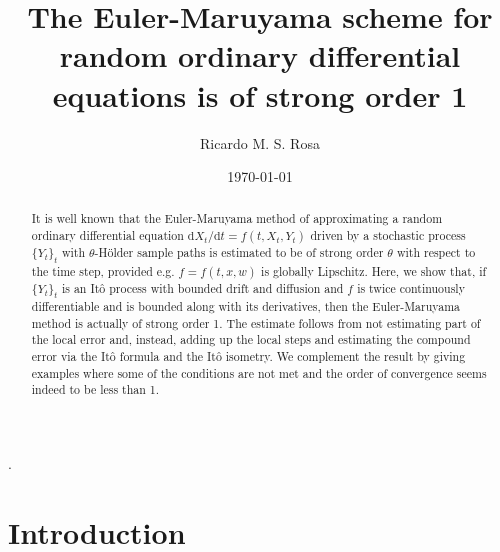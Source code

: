\documentclass[reqno,12pt]{amsart}
\theoremstyle{plain}%
\theoremstyle{definition}
\begin{document}


\title[Euler-Maruyama strong order 1 for Random ODEs]{The Euler-Maruyama scheme for random ordinary differential equations is of strong order 1}

\author[R. Rosa]{Ricardo M. S. Rosa}


\address[Ricardo M. S. Rosa]{Instituto de Matem\'atica, Universidade Federal do Rio de Janeiro, Brazil}


\date{\today}


.

\begin{abstract}
It is well known that the Euler-Maruyama method of approximating a random ordinary differential equation $\mathrm{d}X_t/\mathrm{d}t = f(t, X_t, Y_t)$ driven by a stochastic process $\{Y_t\}_t$ with $\theta$-H\"older sample paths is estimated to be of strong order $\theta$ with respect to the time step, provided e.g. $f=f(t, x, w)$ is globally Lipschitz. Here, we show that, if $\{Y_t\}_t$ is an It\^o process with bounded drift and diffusion and $f$ is twice continuously differentiable and is bounded along with its derivatives, then the Euler-Maruyama method is actually of strong order 1. The estimate follows from not estimating part of the local error and, instead, adding up the local steps and estimating the compound error via the It\^o formula and the It\^o isometry. We complement the result by giving examples where some of the conditions are not met and the order of convergence seems indeed to be less than 1.
\end{abstract}

\maketitle

\section{Introduction}
\end{document}
